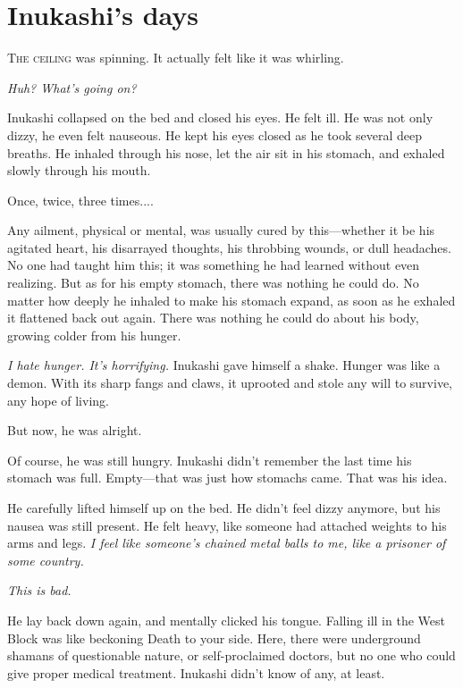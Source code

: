 
\chapter{Inukashi's days}

\lettrine{T}{he ceiling} was spinning. It actually felt like it was whirling.

\emph{Huh? What's going on?}

Inukashi collapsed on the bed and closed his eyes. He felt ill. He was
not only dizzy, he even felt nauseous. He kept his eyes closed as he
took several deep breaths. He inhaled through his nose, let the air sit
in his stomach, and exhaled slowly through his mouth.

Once, twice, three times....

Any ailment, physical or mental, was usually cured by this---whether it be
his agitated heart, his disarrayed thoughts, his throbbing wounds, or
dull headaches. No one had taught him this; it was something he had
learned without even realizing. But as for his empty stomach, there was
nothing he could do. No matter how deeply he inhaled to make his stomach
expand, as soon as he exhaled it flattened back out again. There was
nothing he could do about his body, growing colder from his hunger.

\emph{I hate hunger. It's horrifying.} Inukashi gave himself a shake. Hunger
was like a demon. With its sharp fangs and claws, it uprooted and stole
any will to survive, any hope of living.

But now, he was alright.

Of course, he was still hungry. Inukashi didn't remember the last time
his stomach was full. Empty---that was just how stomachs came. That was
his idea.

He carefully lifted himself up on the bed. He didn't feel dizzy anymore,
but his nausea was still present. He felt heavy, like someone had
attached weights to his arms and legs. \emph{I feel like someone's chained
metal balls to me, like a prisoner of some country.}

\emph{This is bad.}

He lay back down again, and mentally clicked his tongue. Falling ill in
the West Block was like beckoning Death to your side. Here, there were
underground shamans of questionable nature, or self-proclaimed doctors,
but no one who could give proper medical treatment. Inukashi didn't know
of any, at least.

